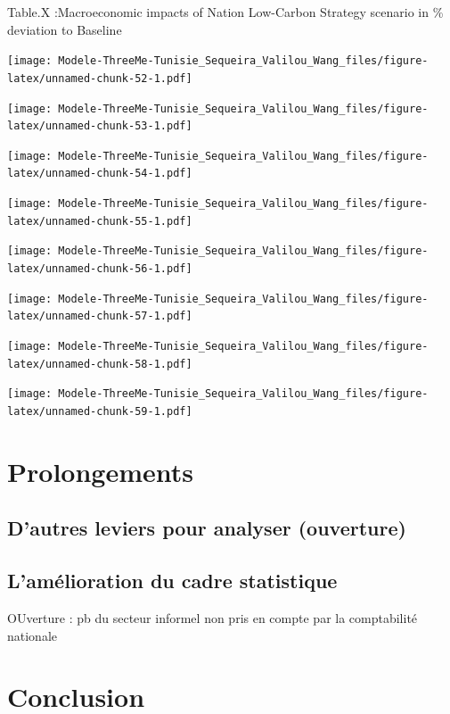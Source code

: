 \documentclass[
]{article}
\begin{document}
Table.X :Macroeconomic impacts of Nation Low-Carbon Strategy scenario in
\% deviation to Baseline

\texttt{[image: Modele-ThreeMe-Tunisie\_Sequeira\_Valilou\_Wang\_files/figure-latex/unnamed-chunk-52-1.pdf]}

\texttt{[image: Modele-ThreeMe-Tunisie\_Sequeira\_Valilou\_Wang\_files/figure-latex/unnamed-chunk-53-1.pdf]}

\texttt{[image: Modele-ThreeMe-Tunisie\_Sequeira\_Valilou\_Wang\_files/figure-latex/unnamed-chunk-54-1.pdf]}

\texttt{[image: Modele-ThreeMe-Tunisie\_Sequeira\_Valilou\_Wang\_files/figure-latex/unnamed-chunk-55-1.pdf]}

\texttt{[image: Modele-ThreeMe-Tunisie\_Sequeira\_Valilou\_Wang\_files/figure-latex/unnamed-chunk-56-1.pdf]}

\texttt{[image: Modele-ThreeMe-Tunisie\_Sequeira\_Valilou\_Wang\_files/figure-latex/unnamed-chunk-57-1.pdf]}

\texttt{[image: Modele-ThreeMe-Tunisie\_Sequeira\_Valilou\_Wang\_files/figure-latex/unnamed-chunk-58-1.pdf]}

\texttt{[image: Modele-ThreeMe-Tunisie\_Sequeira\_Valilou\_Wang\_files/figure-latex/unnamed-chunk-59-1.pdf]}

\hypertarget{prolongements}{%
\section{Prolongements}\label{prolongements}}

\hypertarget{dautres-leviers-pour-analyser-ouverture}{%
\subsection{D'autres leviers pour analyser
(ouverture)}\label{dautres-leviers-pour-analyser-ouverture}}

\hypertarget{lamuxe9lioration-du-cadre-statistique}{%
\subsection{L'amélioration du cadre
statistique}\label{lamuxe9lioration-du-cadre-statistique}}

OUverture : pb du secteur informel non pris en compte par la
comptabilité nationale

\hypertarget{conclusion}{%
\section{Conclusion}\label{conclusion}}

\printbibliography[title=Bibliographie]
\end{document}
